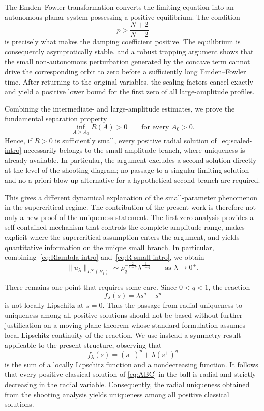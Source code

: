 \documentclass[11pt]{article}
\theoremstyle{definition}
\begin{document}
The Emden--Fowler transformation converts the limiting equation into
an autonomous planar system possessing a positive equilibrium. The
condition
\[
p>\frac{N+2}{N-2}
\]
is precisely what makes the damping coefficient positive. The
equilibrium is consequently asymptotically stable, and a robust
trapping argument shows that the small non-autonomous perturbation
generated by the concave term cannot drive the corresponding orbit
to zero before a sufficiently long Emden--Fowler time. After
returning to the original variables, the scaling factors cancel
exactly and yield a positive lower bound for the first zero of all
large-amplitude profiles.

Combining the intermediate- and large-amplitude estimates, we prove
the fundamental separation property
\begin{equation}
\label{eq:separation-intro}
\inf_{A\geq A_0}R(A)>0
\qquad
\text{for every }A_0>0.
\end{equation}
Hence, if $R>0$ is sufficiently small, every positive radial solution
of~\eqref{eq:scaled-intro} necessarily belongs to the small-amplitude
branch, where uniqueness is already available. In particular, the
argument excludes a second solution directly at the level of the
shooting diagram; no passage to a singular limiting solution and no
a priori blow-up alternative for a hypothetical second branch are
required.

This gives a different dynamical explanation of the small-parameter
phenomenon in the supercritical regime. The contribution of the
present work is therefore not only a new proof of the uniqueness
statement. The first-zero analysis provides a self-contained
mechanism that controls the complete amplitude range, makes explicit
where the supercritical assumption enters the argument, and yields
quantitative information on the unique small branch. In particular,
combining~\eqref{eq:Rlambda-intro} and~\eqref{eq:R-small-intro}, we
obtain
\begin{equation}
\label{eq:asymptotic-intro}
\|u_\lambda\|_{L^\infty(B_1)}
\sim
\rho_q^{-\frac{2}{1-q}}
\lambda^{\frac1{1-q}}
\qquad\text{as }\lambda\to0^+.
\end{equation}

There remains one point that requires some care. Since $0<q<1$, the
reaction
\[
f_\lambda(s)=\lambda s^q+s^p
\]
is not locally Lipschitz at $s=0$. Thus the passage from radial
uniqueness to uniqueness among all positive solutions should not be
based without further justification on a moving-plane theorem whose
standard formulation assumes local Lipschitz continuity of the
reaction. We use instead a symmetry result applicable to the present
structure, observing that
\[
f_\lambda(s)
=
(s^+)^p+\lambda(s^+)^q
\]
is the sum of a locally Lipschitz function and a nondecreasing
function. It follows that every positive classical solution of
\eqref{eq:ABC} in the ball is radial and strictly decreasing in the
radial variable. Consequently, the radial uniqueness obtained from
the shooting analysis yields uniqueness among all positive classical
solutions.
\end{document}
